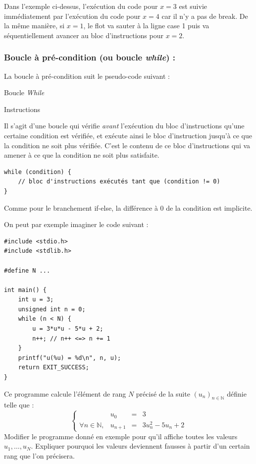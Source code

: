\documentclass[../../../main.tex]{subfiles}
\begin{document}
Dans l'exemple ci-dessus, l'exécution du code pour $x = 3$ est suivie immédiatement par l'exécution du code pour $x = 4$ car il n'y a pas de \textsf{break}. De la même manière, si $x = 1$, le flot va sauter à la ligne \textsf{case 1} puis va séquentiellement avancer au bloc d'instructions pour $x = 2$.
\subsubsection{Boucle à pré-condition (ou boucle \textit{while}) :}
La boucle à pré-condition suit le pseudo-code suivant :
\begin{algorithm}
\caption{Boucle \textit{While}}
 {
	Instructions
}
\end{algorithm}
\newline
Il s'agit d'une boucle qui vérifie \textit{avant} l'exécution du bloc d'instructions qu'une certaine condition est vérifiée, et exécute ainsi le bloc d'instruction jusqu'à ce que la condition ne soit plus vérifiée. C'est le contenu de ce bloc d'instructions qui va amener à ce que la condition ne soit plus satisfaite.
\begin{verbatim}
while (condition) {
	// bloc d'instructions exécutés tant que (condition != 0)
}
\end{verbatim}
Comme pour le branchement \textsf{if-else}, la différence à 0 de la condition est implicite.
 
On peut par exemple imaginer le code suivant :
\begin{verbatim}
#include <stdio.h>
#include <stdlib.h>

#define N ...

int main() {
	int u = 3;
	unsigned int n = 0;
	while (n < N) {
		u = 3*u*u - 5*u + 2;
		n++; // n++ <=> n += 1
	}
	printf("u(%u) = %d\n", n, u);
	return EXIT_SUCCESS;
}
\end{verbatim}
Ce programme calcule l'élément de rang $N$ précisé de la suite $(u_{n})_{n\in{\mathbb{N}}}$ définie telle que :
$$
\left\{\begin{array}{llcl}
& u_{0} & = & 3 \\
\forall{n\in{\mathbb{N}}}, & u_{n+1} & = & 3u_{n}^{2} - 5u_{n} + 2
\end{array}\right.
$$
 Modifier le programme donné en exemple pour qu'il affiche toutes les valeurs $u_{1}, \dots, u_{N}$. \newline
Expliquer pourquoi les valeurs deviennent fausses à partir d'un certain rang que l'on précisera.
 
\end{document}
